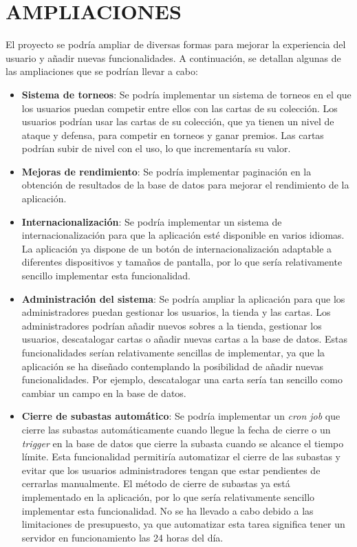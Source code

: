 \newpage
\section{AMPLIACIONES} 
El proyecto se podría ampliar de diversas formas para mejorar la experiencia del usuario y añadir nuevas funcionalidades.
A continuación, se detallan algunas de las ampliaciones que se podrían llevar a cabo:

\begin{itemize}
    \item \textbf{Sistema de torneos}: Se podría implementar un sistema de torneos en el que los usuarios puedan competir entre ellos con las cartas de su colección.
    Los usuarios podrían usar las cartas de su colección, que ya tienen un nivel de ataque y defensa, para competir en torneos y ganar premios.
    Las cartas podrían subir de nivel con el uso, lo que incrementaría su valor.
    \item \textbf{Mejoras de rendimiento}: Se podría implementar paginación en la obtención de resultados de la base de datos para mejorar el rendimiento de la aplicación.
    \item \textbf{Internacionalización}: Se podría implementar un sistema de internacionalización para que la aplicación esté disponible en varios idiomas.
    La aplicación ya dispone de un botón de internacionalización adaptable a diferentes dispositivos y tamaños de pantalla,
    por lo que sería relativamente sencillo implementar esta funcionalidad.
    \item \textbf{Administración del sistema}: Se podría ampliar la aplicación para que los administradores puedan gestionar los usuarios, la tienda y las cartas.
    Los administradores podrían añadir nuevos sobres a la tienda, gestionar los usuarios, descatalogar cartas o añadir nuevas cartas a la base de datos.
    Estas funcionalidades serían relativamente sencillas de implementar, ya que la aplicación se ha diseñado contemplando la posibilidad de añadir nuevas funcionalidades.
    Por ejemplo, descatalogar una carta sería tan sencillo como cambiar un campo en la base de datos.
    \item \textbf{Cierre de subastas automático}: Se podría implementar un \textit{cron job} que cierre las subastas automáticamente cuando llegue la fecha de cierre
    o un \textit{trigger} en la base de datos que cierre la subasta cuando se alcance el tiempo límite.
    Esta funcionalidad permitiría automatizar el cierre de las subastas y evitar que los usuarios administradores tengan que estar pendientes de cerrarlas manualmente.
    El método de cierre de subastas ya está implementado en la aplicación, por lo que sería relativamente sencillo implementar esta funcionalidad.
    No se ha llevado a cabo debido a las limitaciones de presupuesto, ya que automatizar esta tarea significa tener un servidor en funcionamiento las 24 horas del día.

\end{itemize}






